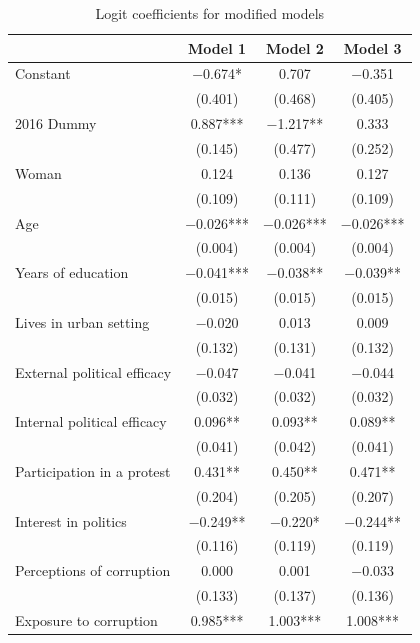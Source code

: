 \documentclass[12pt,a4]{article}\usepackage[]{graphicx}\usepackage[]{xcolor}
\begin{document}
\begin{table}[htbp]
\begin{center}
\caption{Logit coefficients for modified models}
\label{tab:complexmod}

\begin{tabular}[t]{lccc}
\toprule
  & Model 1 & Model 2 & Model 3\\
\midrule
Constant & \num{-0.674}* & \num{0.707} & \num{-0.351}\\
 & (\num{0.401}) & (\num{0.468}) & (\num{0.405})\\
2016 Dummy & \num{0.887}*** & \num{-1.217}** & \num{0.333}\\
 & (\num{0.145}) & (\num{0.477}) & (\num{0.252})\\
Woman & \num{0.124} & \num{0.136} & \num{0.127}\\
 & (\num{0.109}) & (\num{0.111}) & (\num{0.109})\\
Age & \num{-0.026}*** & \num{-0.026}*** & \num{-0.026}***\\
 & (\num{0.004}) & (\num{0.004}) & (\num{0.004})\\
Years of education & \num{-0.041}*** & \num{-0.038}** & \num{-0.039}**\\
 & (\num{0.015}) & (\num{0.015}) & (\num{0.015})\\
Lives in urban setting & \num{-0.020} & \num{0.013} & \num{0.009}\\
 & (\num{0.132}) & (\num{0.131}) & (\num{0.132})\\
External political efficacy & \num{-0.047} & \num{-0.041} & \num{-0.044}\\
 & (\num{0.032}) & (\num{0.032}) & (\num{0.032})\\
Internal political efficacy & \num{0.096}** & \num{0.093}** & \num{0.089}**\\
 & (\num{0.041}) & (\num{0.042}) & (\num{0.041})\\
Participation in a protest & \num{0.431}** & \num{0.450}** & \num{0.471}**\\
 & (\num{0.204}) & (\num{0.205}) & (\num{0.207})\\
Interest in politics & \num{-0.249}** & \num{-0.220}* & \num{-0.244}**\\
 & (\num{0.116}) & (\num{0.119}) & (\num{0.119})\\
Perceptions of corruption & \num{0.000} & \num{0.001} & \num{-0.033}\\
 & (\num{0.133}) & (\num{0.137}) & (\num{0.136})\\
Exposure to corruption & \num{0.985}*** & \num{1.003}*** & \num{1.008}***\\

\end{tabular}
\end{center}
\end{table}
\end{document}
